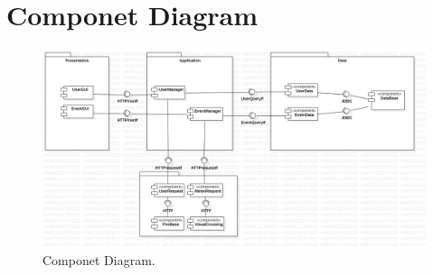\section{Componet Diagram}
\begin{figure}[h!]
	\centering
	\includegraphics[width=0.8\linewidth]{diagrammi/ComponentDiagram1.png}
	\caption{Componet Diagram.}
	\label{fig:ComponentDiagram}
\end{figure}